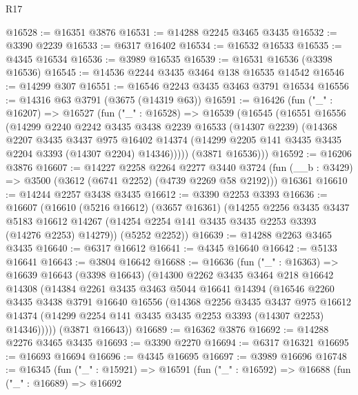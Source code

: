 \begin{lexlean}{R17}
\begin{coremodule}
@16528 := @16351 @3876
@16531 := @14288 @2245 @3465 @3435
@16532 := @3390 @2239
@16533 := @6317 @16402
@16534 := @16532 @16533
@16535 := @4345 @16534
@16536 := @3989 @16535
@16539 := @16531 @16536 (@3398 @16536)
@16545 := @14536 @2244 @3435 @3464 @138 @16535 @14542
@16546 := @14299 @307
@16551 := @16546 @2243 @3435 @3463 @3791 @16534
@16556 := @14316 @63 @3791 (@3675 (@14319 @63))
@16591 := @16426
    (fun ("_" : @16207) =>
    @16527
      (fun ("_" : @16528) =>
      @16539
        (@16545
          (@16551
            @16556
            (@14299
              @2240
              @2242
              @3435
              @3438
              @2239
              @16533
              (@14307 @2239)
              (@14368
                @2207
                @3435
                @3437
                @975
                @16402
                @14374
                (@14299 @2205 @141 @3435 @3435 @2204 @3393 (@14307 @2204) @14346)))))
        (@3871 @16536)))
@16592 := @16206 @3876
@16607 := @14227
    @2258
    @2264
    @2277
    @3440
    @3724
    (fun (__b : @3429) => @3500 (@3612 (@6741 @2252) (@4739 @2269 @58 @2192)))
    @16361
@16610 := @14244 @2257 @3438 @3435
@16612 := @3390 @2253 @3393
@16636 := @16607
    (@16610
      (@5216 @16612)
      (@3657 @16361)
      (@14255
        @2256
        @3435
        @3437
        @5183
        @16612
        @14267
        (@14254 @2254 @141 @3435 @3435 @2253 @3393 (@14276 @2253) @14279))
      (@5252 @2252))
@16639 := @14288 @2263 @3465 @3435
@16640 := @6317 @16612
@16641 := @4345 @16640
@16642 := @5133 @16641
@16643 := @3804 @16642
@16688 := @16636
    (fun ("_" : @16363) =>
    @16639
      @16643
      (@3398 @16643)
      (@14300
        @2262
        @3435
        @3464
        @218
        @16642
        @14308
        (@14384
          @2261
          @3435
          @3463
          @5044
          @16641
          @14394
          (@16546
            @2260
            @3435
            @3438
            @3791
            @16640
            @16556
            (@14368
              @2256
              @3435
              @3437
              @975
              @16612
              @14374
              (@14299 @2254 @141 @3435 @3435 @2253 @3393 (@14307 @2253) @14346)))))
      (@3871 @16643))
@16689 := @16362 @3876
@16692 := @14288 @2276 @3465 @3435
@16693 := @3390 @2270
@16694 := @6317 @16321
@16695 := @16693 @16694
@16696 := @4345 @16695
@16697 := @3989 @16696
@16748 := @16345
    (fun ("_" : @15921) =>
    @16591
      (fun ("_" : @16592) =>
      @16688
        (fun ("_" : @16689) =>
        @16692

\end{coremodule}
\end{lexlean}
